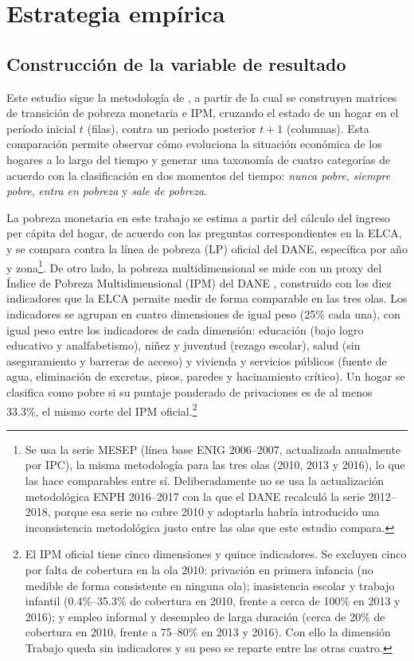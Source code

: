 \documentclass[12pt, letterpaper]{article}
\begin{document}
\section{Estrategia empírica}
\label{sec:estrategia}

\subsection{Construcción de la variable de resultado}
\label{subsec:outcome}

Este estudio sigue la metodología de \textcite{lopezCalva2011,lopezCalva2014}, 
a partir de la cual se construyen matrices de transición de pobreza monetaria e IPM, 
cruzando el estado de un hogar en el período inicial $t$ (filas), 
contra un periodo posterior $t+1$ (columnas). 
Esta comparación permite observar cómo evoluciona 
la situación económica de los hogares a lo largo del tiempo y generar
una taxonomía de cuatro categorías de acuerdo con la clasificación en dos momentos del tiempo:
 \emph{nunca pobre}, \emph{siempre pobre}, \emph{entra en pobreza} y \emph{sale de pobreza}.
 
La pobreza monetaria en este trabajo se estima a partir del cálculo del ingreso per
cápita del hogar, de acuerdo con las preguntas correspondientes en la ELCA, y se compara contra la línea de pobreza (LP) oficial 
del DANE, específica por año y zona\footnote{Se usa la serie MESEP (línea base ENIG 2006--2007,
actualizada anualmente por IPC), la misma metodología para las tres olas
(2010, 2013 y 2016), lo que las hace comparables entre sí. Deliberadamente
no se usa la actualización metodológica ENPH 2016--2017 con la que el
DANE recalculó la serie 2012--2018, porque esa serie no cubre 2010 y
adoptarla habría introducido una inconsistencia metodológica justo entre las olas
que este estudio compara.}. De otro lado, la pobreza multidimensional se
mide con un proxy del Índice de Pobreza Multidimensional (IPM) del DANE
\parencite{angulo2011}, construido con los diez indicadores que la ELCA
permite medir de forma comparable en las tres olas. Los indicadores se
agrupan en cuatro dimensiones de igual peso (25\% cada una), con igual
peso entre los indicadores de cada dimensión: educación (bajo logro
educativo y analfabetismo), niñez y juventud (rezago escolar), salud
(sin aseguramiento y barreras de acceso) y vivienda y servicios públicos
(fuente de agua, eliminación de excretas, pisos, paredes y hacinamiento
crítico). Un hogar se clasifica como pobre si su puntaje ponderado de
privaciones es de al menos 33.3\%, el mismo corte del IPM
oficial.\footnote{El IPM oficial tiene cinco dimensiones y quince
indicadores. Se excluyen cinco por falta de cobertura en la ola 2010:
privación en primera infancia (no medible de forma consistente en
ninguna ola); inasistencia escolar y trabajo infantil (0.4\%--35.3\% de
cobertura en 2010, frente a cerca de 100\% en 2013 y 2016); y empleo
informal y desempleo de larga duración (cerca de 20\% de cobertura en
2010, frente a 75--80\% en 2013 y 2016). Con ello la dimensión Trabajo
queda sin indicadores y su peso se reparte entre las otras cuatro.}
\end{document}
